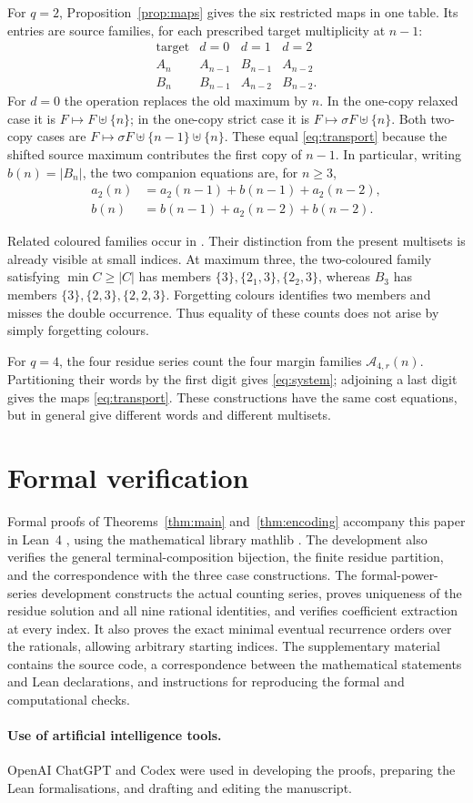\documentclass[11pt,a4paper]{article}
\theoremstyle{remark}
\newcommand{\A}{\mathcal A}
\begin{document}
For $q=2$, Proposition~\ref{prop:maps} gives the six restricted maps in
one table. Its entries are source families, for each prescribed target
multiplicity at $n-1$:
\[
\begin{array}{c|ccc}
\text{target}&d=0&d=1&d=2\\ \hline
 A_n&A_{n-1}&B_{n-1}&A_{n-2}\\
 B_n&B_{n-1}&A_{n-2}&B_{n-2}.
\end{array}
\]
For $d=0$ the operation replaces the old maximum by $n$. In the
one-copy relaxed case it is $F\mapsto F\uplus\{n\}$; in the one-copy
strict case it is $F\mapsto\sigma F\uplus\{n\}$. Both two-copy cases
are $F\mapsto\sigma F\uplus\{n-1\}\uplus\{n\}$. These equal
\eqref{eq:transport} because the shifted source maximum contributes the
first copy of $n-1$. In particular, writing $b(n)=|B_n|$, the two
companion equations are, for $n\ge3$,
\begin{align*}
 a_2(n)&=a_2(n-1)+b(n-1)+a_2(n-2),\\
 b(n)&=b(n-1)+a_2(n-2)+b(n-2).
\end{align*}

Related coloured families occur in \cite{CIMSZ}. Their distinction from
the present multisets is already visible at small indices. At maximum three, the two-coloured family satisfying
$\min C\ge|C|$ has members $\{3\},\{2_1,3\},\{2_2,3\}$, whereas
$B_3$ has members $\{3\},\{2,3\},\{2,2,3\}$. Forgetting colours
identifies two members and misses the double occurrence. Thus equality of these counts does not arise by simply forgetting colours.

For $q=4$, the four residue series count the four margin families
$\A_{4,r}(n)$. Partitioning their words by the first digit gives
\eqref{eq:system}; adjoining a last digit gives the maps
\eqref{eq:transport}. These constructions have the same cost equations,
but in general give different words and different multisets.

\section*{Formal verification}

Formal proofs of Theorems~\ref{thm:main} and~\ref{thm:encoding} accompany
this paper in Lean~4 \cite{Lean4}, using the mathematical library mathlib
\cite{Mathlib}. The development also verifies the general terminal-composition
bijection, the finite residue partition, and the correspondence with
the three case constructions. The formal-power-series development
constructs the actual counting series, proves uniqueness of the residue
solution and all nine rational identities, and verifies coefficient
extraction at every index. It also proves the exact minimal eventual
recurrence orders over the rationals, allowing arbitrary starting
indices. The supplementary material
contains the source code, a correspondence between the mathematical
statements and Lean declarations, and instructions for reproducing
the formal and computational checks.

\paragraph{Use of artificial intelligence tools.}
OpenAI ChatGPT and Codex were used in developing the proofs, preparing
the Lean formalisations, and drafting and editing the manuscript.



\end{document}
